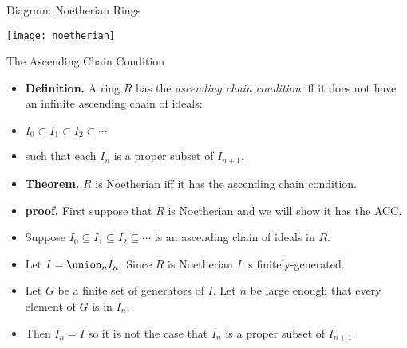 \documentclass{beamer}
\begin{document}

\begin{frame}{Diagram: Noetherian Rings}

\begin{center}
\texttt{[image: noetherian]}
\end{center}

\end{frame}



\begin{frame}{The Ascending Chain Condition}

\begin{itemize}
  \item \textbf{Definition.} A ring $R$ has the \emph{ascending chain condition} iff it does not have an infinite
  ascending chain of ideals:
  \item $I_0 \subset  I_1 \subset I_2 \subset \cdots$
  \item such that each $I_n$ is a proper subset of $I_{n+1}$.
  \item \textbf{Theorem.} $R$ is Noetherian iff it has the ascending chain condition.
  \item \textbf{proof.} First suppose that $R$ is Noetherian and we will show it has the ACC.
  \item  Suppose $I_0 \subseteq  I_1 \subseteq I_2 \subseteq \cdots$ is an ascending chain of ideals in $R$.
  \item Let $I=\union_n I_n$. Since $R$ is Noetherian $I$ is finitely-generated.
  \item Let $G$ be a finite set of generators of $I$. Let $n$ be large enough that every element of $G$ is in $I_n$.
  \item Then $I_n=I$ so it is not the case that $I_n$ is a proper subset of $I_{n+1}$.
\end{itemize}

\end{frame}


\end{document}
